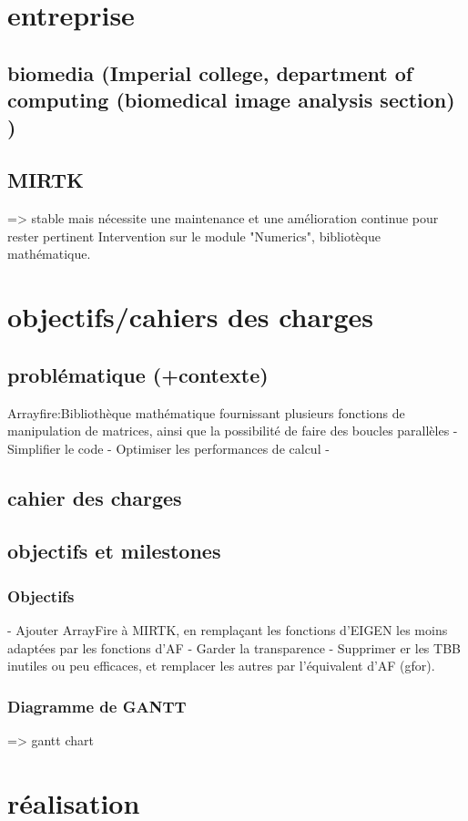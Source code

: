 \documentclass{report}
\begin{document}
\chapter{entreprise} 
	\section{biomedia (Imperial college, department of computing (biomedical image analysis section) )}
	\section{MIRTK}
	 => stable mais nécessite une maintenance et une amélioration continue pour rester pertinent
	 Intervention sur le module "Numerics", bibliotèque mathématique.
\chapter{ objectifs/cahiers des charges}
	\section{problématique (+contexte)}
	Arrayfire:Bibliothèque mathématique fournissant plusieurs fonctions de manipulation de matrices, ainsi que la possibilité de faire des boucles parallèles
	- Simplifier le code - Optimiser les performances de calcul -
	\section{cahier des charges}
	\section{objectifs et milestones}
	\subsection{Objectifs}- Ajouter ArrayFire à MIRTK, en remplaçant les fonctions d'EIGEN les moins adaptées par les fonctions d'AF
	- Garder la transparence
	- Supprimer er les TBB inutiles ou peu efficaces, et remplacer les autres par l'équivalent d'AF (gfor).
	\subsection{Diagramme de GANTT}
	 => gantt chart
	
\chapter{ réalisation}
\end{document}
